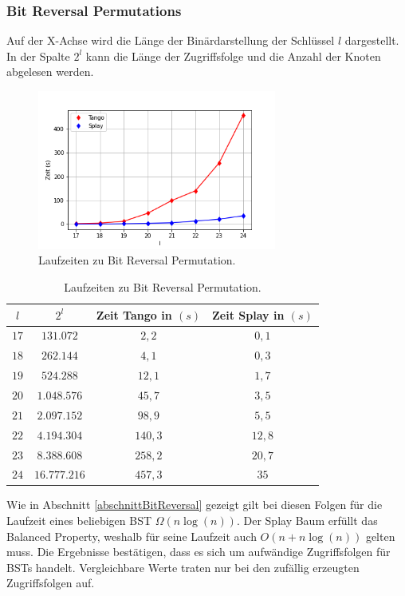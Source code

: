 \documentclass[a4paper,12pt]{article}
\begin{document}
\subsubsection{Bit Reversal Permutations}
Auf der X-Achse wird die Länge der Binärdarstellung der Schlüssel $l$ dargestellt. In der Spalte $2^l$ kann die Länge der Zugriffsfolge und die Anzahl der Knoten abgelesen werden. 
\begin{figure}[H]
	\centering
	\includegraphics[width=0.7\textwidth]{"Medien/laufzeittest/diagramm/brp"}
	\caption{Laufzeiten zu Bit Reversal Permutation.}
	\label{fig:ResultGUI}
\end{figure}
\begin{table}[H]
	\begin{center}
		\begin{tabular}[c]{|c|c|c|c|}
			\hline
			$l$ & $2^l$ &Zeit Tango in $\left(s\right)$ &Zeit Splay in $\left(s\right)$ \\
			\hline
			$17$ &	$131.072 $ &$2,2$ &$0,1$ \\
			\hline
			$18$  &$262.144 $ &$4,1$ &$0,3$  \\
			\hline
			$19$  &$524.288 $ &$12,1$ &$1,7$  \\
			\hline
			$20$  &$1.048.576 $ &$45,7$ &$3,5$  \\
			\hline
			$21$  &$2.097.152 $ &$98,9$ &$5,5$  \\
			\hline
			$22$  &$4.194.304 $ &$140,3$ &$12,8$  \\
			\hline
			$23$  &$8.388.608 $ &$258,2$ &$20,7$  \\
			\hline
			$24$  &$16.777.216$ &$457,3$ &$35$  \\
			\hline
		\end{tabular}
		\caption{Laufzeiten zu Bit Reversal Permutation.} 
	\end{center}
\end{table}
\noindent Wie in Abschnitt \ref{abschnittBitReversal} gezeigt gilt bei diesen Folgen für die Laufzeit eines beliebigen BST $\Omega \left(n \log\left(n\right)\right)$. Der Splay Baum erfüllt das Balanced Property, weshalb für seine Laufzeit auch $O\left(n + n \log\left(n\right)\right)$ gelten muss. Die Ergebnisse bestätigen, dass es sich um aufwändige Zugriffsfolgen für BSTs handelt. Vergleichbare Werte traten nur bei den zufällig erzeugten Zugriffsfolgen auf. \\
\end{document}
